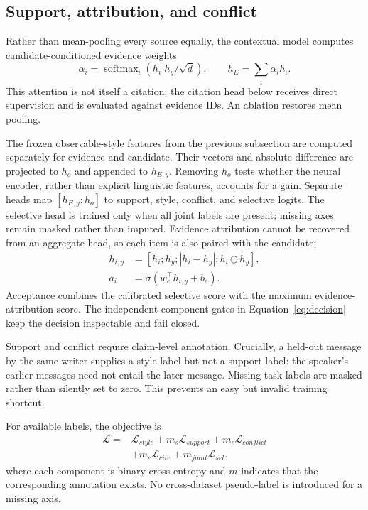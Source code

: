 \documentclass[11pt,a4paper]{article}
\begin{document}
\subsection{Support, attribution, and conflict}

Rather than mean-pooling every source equally, the contextual model computes
candidate-conditioned evidence weights
\begin{equation}
 \alpha_i=\operatorname{softmax}_i(h_i^\top h_y/\sqrt{d}),\qquad
 h_E=\sum_i\alpha_i h_i.
\end{equation}
This attention is not itself a citation: the citation head below receives
direct supervision and is evaluated against evidence IDs.  An ablation restores
mean pooling.

The frozen observable-style features from the previous subsection are computed
separately for evidence and candidate.  Their vectors and absolute difference
are projected to $h_o$ and appended to $h_{E,y}$.  Removing $h_o$ tests whether
the neural encoder, rather than explicit linguistic features, accounts for a
gain.  Separate heads map $[h_{E,y};h_o]$ to support, style, conflict, and
selective logits.  The selective head is trained only when all joint labels are
present; missing axes remain masked rather than imputed.
Evidence attribution cannot be recovered from an aggregate head, so each item
is also paired with the candidate:
\begin{equation}
 \begin{split}
 h_{i,y}&=[h_i;h_y;|h_i-h_y|;h_i\odot h_y],\\
 a_i&=\sigma(w_e^\top h_{i,y}+b_e).
 \end{split}
\end{equation}
Acceptance combines the calibrated selective score with the maximum
evidence-attribution score.  The independent component gates in
Equation~\ref{eq:decision} keep the decision inspectable and fail closed.

Support and conflict require claim-level annotation.  Crucially, a held-out
message by the same writer supplies a style label but not a support label: the
speaker's earlier messages need not entail the later message.  Missing task
labels are masked rather than silently set to zero.  This prevents an easy but
invalid training shortcut.

For available labels, the objective is
\begin{equation}
 \begin{split}
 \mathcal{L}={}&\mathcal{L}_{style}+m_s\mathcal{L}_{support}
 +m_c\mathcal{L}_{conflict}\\
 &+m_e\mathcal{L}_{cite}+m_{joint}\mathcal{L}_{sel}.
 \end{split}
\end{equation}
where each component is binary cross entropy and $m$ indicates that the
corresponding annotation exists.  No cross-dataset pseudo-label is introduced
for a missing axis.
\end{document}
